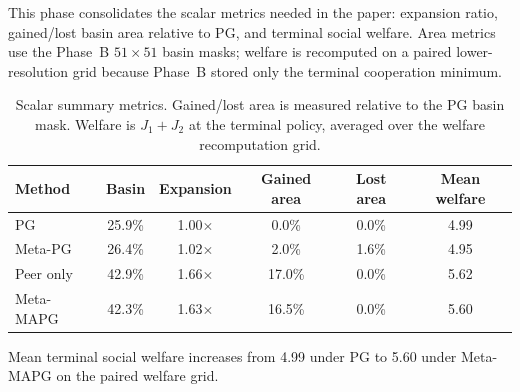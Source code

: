 This phase consolidates the scalar metrics needed in the paper: expansion ratio, gained/lost basin area relative to PG, and terminal social welfare. Area metrics use the Phase~B $51\times51$ basin masks; welfare is recomputed on a paired lower-resolution grid because Phase~B stored only the terminal cooperation minimum.

\begin{table}[h]
  \centering
\begin{tabular}{lccccc}
  \toprule
  Method & Basin & Expansion & Gained area & Lost area & Mean welfare \\
  \midrule
  PG & 25.9\% & 1.00$\times$ & 0.0\% & 0.0\% & 4.99 \\
  Meta-PG & 26.4\% & 1.02$\times$ & 2.0\% & 1.6\% & 4.95 \\
  Peer only & 42.9\% & 1.66$\times$ & 17.0\% & 0.0\% & 5.62 \\
  Meta-MAPG & 42.3\% & 1.63$\times$ & 16.5\% & 0.0\% & 5.60 \\
  \bottomrule
\end{tabular}
  \caption{Scalar summary metrics. Gained/lost area is measured relative to the PG basin mask. Welfare is $J_1+J_2$ at the terminal policy, averaged over the welfare recomputation grid.}
  \label{tab:phase-n-summary}
\end{table}

Mean terminal social welfare increases from 4.99 under PG to 5.60 under Meta-MAPG on the paired welfare grid.
